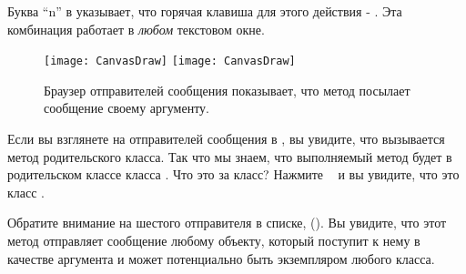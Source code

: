 \documentclass[a4paper,10pt,twoside]{book}
\begin{document}
Буква ``n'' в  указывает, что горячая клавиша для этого действия - . Эта комбинация работает в \emph{любом} текстовом окне.



\begin{figure}[htbp]
	\begin{center}
   \ifluluelse
		{\texttt{[image: CanvasDraw]}}
		{\texttt{[image: CanvasDraw]}}
	\end{center}
	\caption{Браузер отправителей сообщения показывает, что метод  посылает сообщение  своему аргументу.	}
\end{figure}


Если вы взглянете на отправителей сообщения  в , вы увидите, что вызывается метод родительского класса. Так что мы знаем, что выполняемый метод будет в родительском классе класса . Что это за класс?  Нажмите ~  и вы увидите, что это класс .


Обратите внимание на шестого отправителя в списке,  (). Вы увидите, что этот метод отправляет сообщение  любому объекту, который поступит к нему в качестве аргумента и может потенциально быть экземпляром любого класса.

\end{document}

